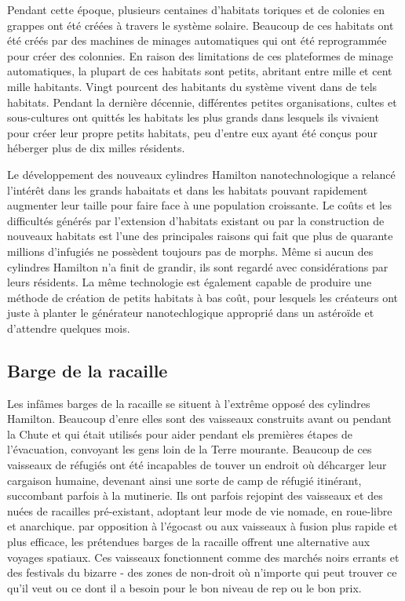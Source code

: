 Pendant cette époque, plusieurs centaines d'habitats toriques et de colonies en grappes ont été créées à travers le système solaire. Beaucoup de ces habitats ont été créés par des machines de minages automatiques qui ont été reprogrammée pour créer des colonnies. En raison des limitations de ces plateformes de minage automatiques, la plupart de ces habitats sont petits, abritant entre mille et cent mille habitants. Vingt pourcent des habitants du système vivent dans de tels habitats. Pendant la dernière décennie, différentes petites organisations, cultes et sous-cultures ont quittés les habitats les plus grands dans lesquels ils vivaient pour créer leur propre petits habitats, peu d'entre eux ayant été conçus pour héberger plus de dix milles résidents. 

Le développement des nouveaux cylindres Hamilton nanotechnologique a relancé l'intérêt dans les grands habaitats et dans les habitats pouvant rapidement augmenter leur taille pour faire face à une population croissante. Le coûts et les difficultés générés par l'extension d'habitats existant ou par la construction de nouveaux habitats est l'une des principales raisons qui fait que plus de quarante millions d'infugiés ne possèdent toujours pas de morphs. Même si aucun des cylindres Hamilton n'a finit de grandir, ils sont regardé avec considérations par leurs résidents. La même technologie est également capable de produire une méthode de création de petits habitats à bas coût, pour lesquels les créateurs ont juste à planter le générateur nanotechlogique approprié dans un astéroïde et d'attendre quelques mois. 

\subsection{Barge de la racaille} \label{sec:scum-barges} 

Les infâmes barges de la racaille se situent à l'extrême opposé des cylindres Hamilton. Beaucoup d'enre elles sont des vaisseaux construits avant ou pendant la Chute et qui était utilisés pour aider pendant els premières étapes de l'évacuation, convoyant les gens loin de la Terre mourante. Beaucoup de ces vaisseaux de réfugiés ont été incapables de touver un endroit où déhcarger leur cargaison humaine, devenant ainsi une sorte de camp de réfugié itinérant, succombant parfois à la mutinerie. Ils ont parfois rejopint des vaisseaux et des nuées de racailles pré-existant, adoptant leur mode de vie nomade, en roue-libre et anarchique. par opposition à l'égocast ou aux vaisseaux à fusion plus rapide et plus efficace, les prétendues barges de la racaille offrent une alternative aux voyages spatiaux. Ces vaisseaux fonctionnent comme des marchés noirs errants et des festivals du bizarre - des zones de non-droit où n'importe qui peut trouver ce qu'il veut ou ce dont il a besoin pour le bon niveau de rep ou le bon prix. 

